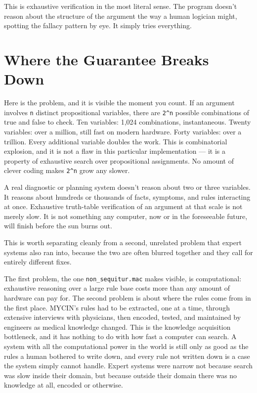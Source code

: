 This is exhaustive verification in the most literal sense. The program doesn't reason about the structure of the argument the way a human logician might, spotting the fallacy pattern by eye. It simply tries everything.

\section*{Where the Guarantee Breaks Down}

Here is the problem, and it is visible the moment you count. If an argument involves \texttt{n} distinct propositional variables, there are \texttt{2\textasciicircum{}n} possible combinations of true and false to check. Ten variables: 1,024 combinations, instantaneous. Twenty variables: over a million, still fast on modern hardware. Forty variables: over a trillion. Every additional variable doubles the work. This is combinatorial explosion, and it is not a flaw in this particular implementation — it is a property of exhaustive search over propositional assignments. No amount of clever coding makes \texttt{2\textasciicircum{}n} grow any slower.

A real diagnostic or planning system doesn't reason about two or three variables. It reasons about hundreds or thousands of facts, symptoms, and rules interacting at once. Exhaustive truth-table verification of an argument at that scale is not merely slow. It is not something any computer, now or in the foreseeable future, will finish before the sun burns out.

This is worth separating cleanly from a second, unrelated problem that expert systems also ran into, because the two are often blurred together and they call for entirely different fixes.

The first problem, the one \texttt{non\_sequitur.mac} makes visible, is computational: exhaustive reasoning over a large rule base costs more than any amount of hardware can pay for. The second problem is about where the rules come from in the first place. MYCIN's rules had to be extracted, one at a time, through extensive interviews with physicians, then encoded, tested, and maintained by engineers as medical knowledge changed. This is the knowledge acquisition bottleneck, and it has nothing to do with how fast a computer can search. A system with all the computational power in the world is still only as good as the rules a human bothered to write down, and every rule not written down is a case the system simply cannot handle. Expert systems were narrow not because search was slow inside their domain, but because outside their domain there was no knowledge at all, encoded or otherwise.

